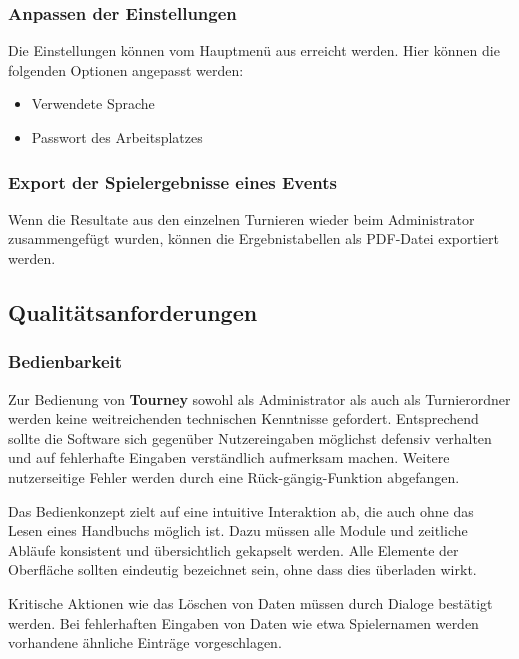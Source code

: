 \documentclass[11pt]{article}
\begin{document}
\subsubsection{Anpassen der Einstellungen}

Die Einstellungen können vom Hauptmenü aus erreicht werden. Hier können die folgenden Optionen angepasst werden:
\begin{itemize}
	\item Verwendete Sprache
	\item Passwort des Arbeitsplatzes
\end{itemize}

\subsubsection{Export der Spielergebnisse eines Events}

Wenn die Resultate aus den einzelnen Turnieren wieder beim Administrator zusammengefügt wurden, können die Ergebnistabellen als PDF-Datei exportiert werden.

\newpage

\subsection{Qualitätsanforderungen}

\subsubsection{Bedienbarkeit}

Zur Bedienung von \textbf{Tourney} sowohl als Administrator als auch als Turnierordner werden keine weitreichenden technischen Kenntnisse gefordert. Entsprechend sollte die Software sich gegenüber Nutzereingaben möglichst defensiv verhalten und auf fehlerhafte Eingaben verständlich aufmerksam machen. Weitere nutzerseitige Fehler werden durch eine Rück-gängig-Funktion abgefangen.

Das Bedienkonzept zielt auf eine intuitive Interaktion ab, die auch ohne das Lesen eines Handbuchs möglich ist. Dazu müssen alle Module und zeitliche Abläufe konsistent und übersichtlich gekapselt werden. Alle Elemente der Oberfläche sollten eindeutig bezeichnet sein, ohne dass dies überladen wirkt.

Kritische Aktionen wie das Löschen von Daten müssen durch Dialoge bestätigt werden. Bei fehlerhaften Eingaben von Daten wie etwa Spielernamen werden vorhandene ähnliche Einträge vorgeschlagen.
\end{document}
